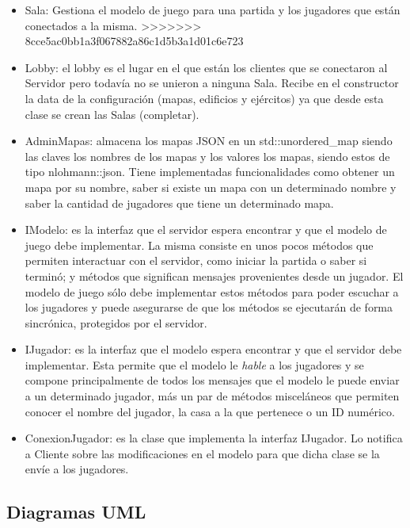 \documentclass[titlepage,a4paper,12pt]{article}
\begin{document}
\begin{itemize}
\item Sala: Gestiona el modelo de juego para una partida y los jugadores que están conectados a la misma.
>>>>>>> 8cce5ac0bb1a3f067882a86c1d5b3a1d01c6e723

\item Lobby: el lobby es el lugar en el que están los clientes que se conectaron al Servidor pero todavía no se unieron a ninguna Sala. Recibe en el constructor la data de la configuración (mapas, edificios y ejércitos) ya que desde esta clase se crean las Salas (completar).

\item AdminMapas: almacena los mapas JSON en un std::unordered\_map siendo las claves los nombres de los mapas y los valores los mapas, siendo estos de tipo nlohmann::json. Tiene implementadas funcionalidades como obtener un mapa por su nombre, saber si existe un mapa con un determinado nombre y saber la cantidad de jugadores que tiene un determinado mapa.

\item IModelo: es la interfaz que el servidor espera encontrar y que el modelo de juego debe implementar. La misma consiste en unos pocos métodos que permiten interactuar con el servidor, como iniciar la partida o saber si terminó; y métodos que significan mensajes provenientes desde un jugador. El modelo de juego sólo debe implementar estos métodos para poder escuchar a los jugadores y puede asegurarse de que los métodos se ejecutarán de forma sincrónica, protegidos por el servidor.

\item IJugador: es la interfaz que el modelo espera encontrar y que el servidor debe implementar. Esta permite que el modelo le \textit{hable} a los jugadores y se compone principalmente de todos los mensajes que el modelo le puede enviar a un determinado jugador, más un par de métodos misceláneos que permiten conocer el nombre del jugador, la casa a la que pertenece o un ID numérico.

\item ConexionJugador: es la clase que implementa la interfaz IJugador. Lo notifica a Cliente sobre las modificaciones en el modelo para que dicha clase se la envíe a los jugadores.

\end{itemize}

\subsection{Diagramas UML}
\end{document}
